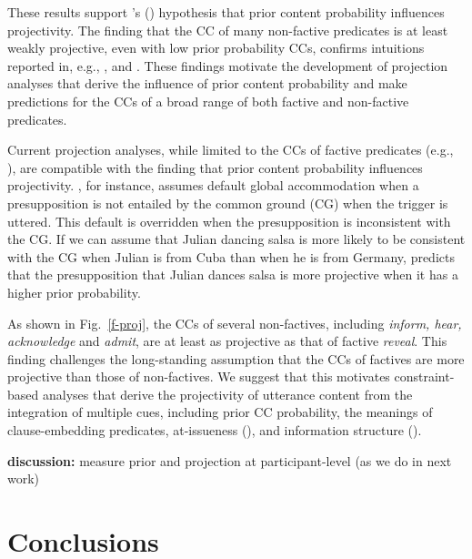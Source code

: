 \documentclass[11pt,fleqn]{article}
\newcommand{\6}{\mbox{$[\hspace*{-.6mm}[$}}
\newcommand{\9}{\mbox{$]\hspace*{-.6mm}]$}}
\newcommand{\citetpos}[1]{\citeauthor{#1}'s (\citeyear{#1})}
\begin{document}
These results support \citetpos{tbd-variability} hypothesis that prior content probability influences projectivity. The finding that the CC of many non-factive predicates is at least weakly projective, even with low prior probability CCs, confirms intuitions reported in, e.g., \citealt{schlenker10}, \citealt{anand-hacquard2014} and \citealt{spector-egre2015}. These findings motivate the development of projection analyses that derive the influence of prior content probability and make predictions for the CCs of a broad range of both factive and non-factive predicates.

Current projection analyses, while limited to the CCs of factive predicates (e.g., \citealt{heim83,vds92,abrusan2011,brst-salt10,brst-ar}), are compatible with the finding that prior content probability influences projectivity. \citealt{heim83}, for instance, assumes default global accommodation when a presupposition is not entailed by the common ground (CG) when the trigger is uttered. This default is overridden when the presupposition is inconsistent with the CG. If we can assume that Julian dancing salsa is more likely to be consistent with the CG when Julian is from Cuba than when he is from Germany, \citealt{heim83} predicts that the presupposition that Julian dances salsa is more projective when it has a higher prior probability. 

As shown in Fig.~\ref{f-proj}, the CCs of several non-factives, including {\em inform, hear, acknowledge} and {\em admit}, are at least as projective as that of factive {\em reveal}. This finding challenges the long-standing assumption that the CCs of factives are more projective than those of non-factives. We suggest that this motivates constraint-based analyses that derive the projectivity of utterance content from the integration of multiple cues, including prior CC probability, the meanings of clause-embedding predicates, at-issueness (\citealt{tbd-variability}), and information structure (\citealt{tonhauser-salt26}).

{\bf discussion:} measure prior and projection at participant-level (as we do in next work)

\section{Conclusions}\label{s5}

\appendix

\setcounter{table}{0}
\renewcommand{\thetable}{A\arabic{table}}

\setcounter{figure}{0}
\renewcommand{\thefigure}{A\arabic{figure}}
\end{document}
